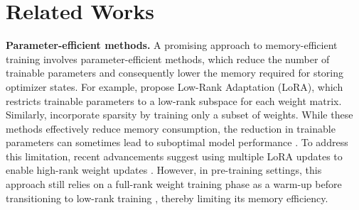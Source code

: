 \section{Related Works}

\textbf{Parameter-efficient methods.} 
A promising approach to memory-efficient training involves parameter-efficient methods, which reduce the number of trainable parameters and consequently lower the memory required for storing optimizer states. For example, \cite{hu2021lora} propose Low-Rank Adaptation (LoRA), which restricts trainable parameters to a low-rank subspace for each weight matrix. Similarly, \cite{thangarasa2023spdf} incorporate sparsity by training only a subset of weights. While these methods effectively reduce memory consumption, the reduction in trainable parameters can sometimes lead to suboptimal model performance \citep{biderman2024lora}. To address this limitation, recent advancements suggest using multiple LoRA updates to enable high-rank weight updates \citep{lialin2023relora, xia2024chain}. However, in pre-training settings, this approach still relies on a full-rank weight training phase as a warm-up before transitioning to low-rank training \citep{lialin2023relora}, thereby limiting its memory efficiency.

